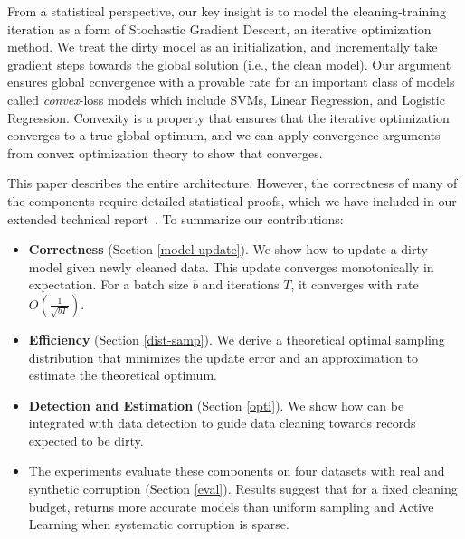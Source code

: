 From a statistical perspective, our key insight is to model the cleaning-training iteration as a form of Stochastic Gradient Descent, an iterative optimization method.
We treat the dirty model as an initialization, and incrementally take gradient steps towards the global solution (i.e., the clean model).
Our argument ensures global convergence with a provable rate for an important class of models called \emph{convex}-loss models which include SVMs, Linear Regression, and Logistic Regression.
Convexity is a property that ensures that the iterative optimization converges to a true global optimum, and we can apply convergence arguments from convex optimization theory to show that \sys converges.

This paper describes the entire \sys architecture. However, the correctness of many of the components require detailed statistical proofs, which we have included in our extended technical report~\cite{activecleanarxiv}. To summarize our contributions:
\begin{itemize}[noitemsep]
\item \textbf{Correctness} (Section \ref{model-update}). We show how to update a dirty model given newly cleaned data. This update converges monotonically in expectation. For a batch size $b$ and iterations $T$, it converges with rate $O(\frac{1}{\sqrt{bT}})$. 
\item \textbf{Efficiency} (Section \ref{dist-samp}). We derive a theoretical optimal sampling distribution that minimizes the update error and an approximation to estimate the theoretical optimum.
\item \textbf{Detection and Estimation} (Section \ref{opti}). We show how \sys can be integrated with data detection to guide data cleaning towards records expected to be dirty.
\item The experiments evaluate these components on four datasets with real and synthetic corruption (Section \ref{eval}). Results suggest that for a fixed cleaning budget, \sys returns more accurate models than uniform sampling and Active Learning when systematic corruption is sparse.

\end{itemize}






